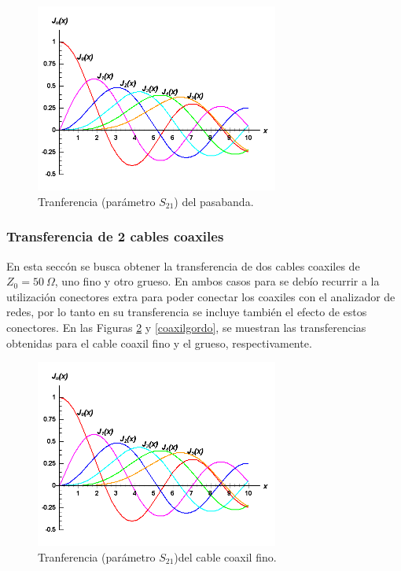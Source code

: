 \documentclass[a4paper,10pt]{article}
\begin{document}
		\begin{figure}[!htb]
				\centering
				\includegraphics[width=8cm]
				{Imagenes/bessel.png}
				\caption{Tranferencia (par\'ametro $S_{21}$) del pasabanda.}
				\label{transferenciabandpass} 
		\end{figure}

		\subsubsection{Transferencia de 2 cables coaxiles}
		\indent En esta secc\'on se  busca obtener la transferencia de dos 
		cables coaxiles de $Z_0=50~\Omega$, uno fino y otro grueso. En ambos 
		casos para se deb\'io recurrir a la utilizaci\'on conectores extra para 
		poder conectar los coaxiles con el analizador de redes, por lo tanto en 
		su transferencia se incluye tambi\'en el efecto de estos conectores. En 
		las Figuras \ref{caoxilflaco} y \ref{coaxilgordo}, se muestran las 
		transferencias obtenidas para el cable coaxil fino y el grueso, 
		respectivamente.
		
		\begin{figure}[!htb]
			\centering
			\includegraphics[width=8cm]
			{Imagenes/bessel.png}
			\caption{Tranferencia (par\'ametro $S_{21}$)del cable coaxil 
			fino.}
			\label{caoxilflaco} 
		\end{figure}
		
\end{document}
